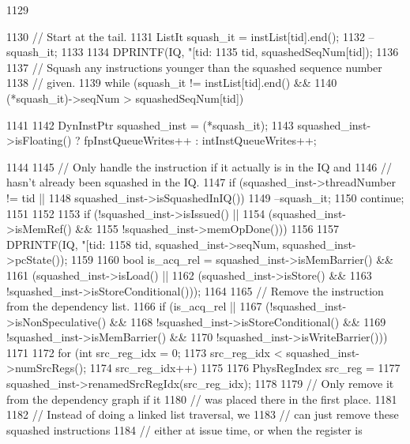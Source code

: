 \begin{DoxyCode}
1129 {
1130     // Start at the tail.
1131     ListIt squash_it = instList[tid].end();
1132     --squash_it;
1133 
1134     DPRINTF(IQ, "[tid:%
1135             tid, squashedSeqNum[tid]);
1136 
1137     // Squash any instructions younger than the squashed sequence number
1138     // given.
1139     while (squash_it != instList[tid].end() &&
1140            (*squash_it)->seqNum > squashedSeqNum[tid]) {
1141 
1142         DynInstPtr squashed_inst = (*squash_it);
1143         squashed_inst->isFloating() ? fpInstQueueWrites++ : intInstQueueWrites++;
      
1144 
1145         // Only handle the instruction if it actually is in the IQ and
1146         // hasn't already been squashed in the IQ.
1147         if (squashed_inst->threadNumber != tid ||
1148             squashed_inst->isSquashedInIQ()) {
1149             --squash_it;
1150             continue;
1151         }
1152 
1153         if (!squashed_inst->isIssued() ||
1154             (squashed_inst->isMemRef() &&
1155              !squashed_inst->memOpDone())) {
1156 
1157             DPRINTF(IQ, "[tid:%
1158                     tid, squashed_inst->seqNum, squashed_inst->pcState());
1159 
1160             bool is_acq_rel = squashed_inst->isMemBarrier() &&
1161                          (squashed_inst->isLoad() ||
1162                            (squashed_inst->isStore() &&
1163                              !squashed_inst->isStoreConditional()));
1164 
1165             // Remove the instruction from the dependency list.
1166             if (is_acq_rel ||
1167                 (!squashed_inst->isNonSpeculative() &&
1168                  !squashed_inst->isStoreConditional() &&
1169                  !squashed_inst->isMemBarrier() &&
1170                  !squashed_inst->isWriteBarrier())) {
1171 
1172                 for (int src_reg_idx = 0;
1173                      src_reg_idx < squashed_inst->numSrcRegs();
1174                      src_reg_idx++)
1175                 {
1176                     PhysRegIndex src_reg =
1177                         squashed_inst->renamedSrcRegIdx(src_reg_idx);
1178 
1179                     // Only remove it from the dependency graph if it
1180                     // was placed there in the first place.
1181 
1182                     // Instead of doing a linked list traversal, we
1183                     // can just remove these squashed instructions
1184                     // either at issue time, or when the register is
}}}}}
\end{DoxyCode}
